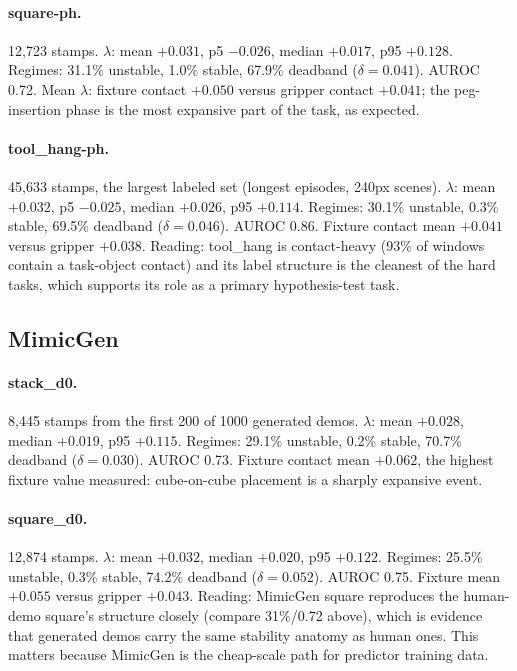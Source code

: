 \documentclass[11pt]{article}
\begin{document}
\paragraph{square-ph.}
12{,}723 stamps. $\lambda$: mean $+0.031$, p5 $-0.026$, median $+0.017$, p95
$+0.128$. Regimes: 31.1\% unstable, 1.0\% stable, 67.9\% deadband
($\delta = 0.041$). AUROC 0.72. Mean $\lambda$: fixture contact $+0.050$ versus
gripper contact $+0.041$; the peg-insertion phase is the most expansive part of the
task, as expected.

\paragraph{tool\_hang-ph.}
45{,}633 stamps, the largest labeled set (longest episodes, 240px scenes). $\lambda$:
mean $+0.032$, p5 $-0.025$, median $+0.026$, p95 $+0.114$. Regimes: 30.1\% unstable,
0.3\% stable, 69.5\% deadband ($\delta = 0.046$). AUROC 0.86. Fixture contact mean
$+0.041$ versus gripper $+0.038$. Reading: tool\_hang is contact-heavy (93\% of
windows contain a task-object contact) and its label structure is the cleanest of
the hard tasks, which supports its role as a primary hypothesis-test task.

\subsection{MimicGen}

\paragraph{stack\_d0.}
8{,}445 stamps from the first 200 of 1000 generated demos. $\lambda$: mean $+0.028$,
median $+0.019$, p95 $+0.115$. Regimes: 29.1\% unstable, 0.2\% stable, 70.7\%
deadband ($\delta = 0.030$). AUROC 0.73. Fixture contact mean $+0.062$, the highest
fixture value measured: cube-on-cube placement is a sharply expansive event.

\paragraph{square\_d0.}
12{,}874 stamps. $\lambda$: mean $+0.032$, median $+0.020$, p95 $+0.122$. Regimes:
25.5\% unstable, 0.3\% stable, 74.2\% deadband ($\delta = 0.052$). AUROC 0.75.
Fixture mean $+0.055$ versus gripper $+0.043$. Reading: MimicGen square reproduces
the human-demo square's structure closely (compare 31\%/0.72 above), which is
evidence that generated demos carry the same stability anatomy as human ones. This
matters because MimicGen is the cheap-scale path for predictor training data.
\end{document}
